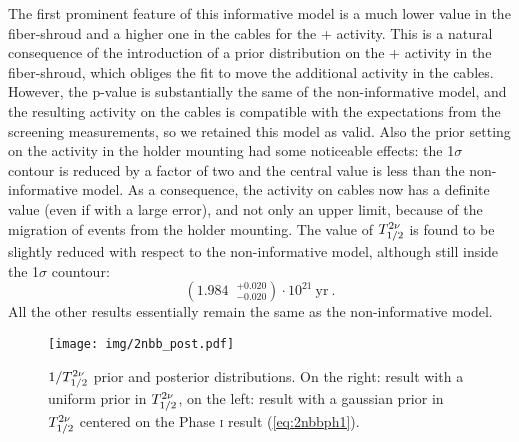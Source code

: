  The first prominent feature of this informative model is a much lower value in the fiber-shroud and a higher one in the cables for the  +  activity. This is a natural consequence of the introduction of a prior distribution on the  +  activity in the fiber-shroud, which obliges the fit to move the additional activity in the cables. However, the p-value is substantially the same of the non-informative model, and the resulting activity on the cables is compatible with the expectations from the screening measurements, so we retained this model as valid. Also the prior setting on the  activity in the holder mounting had some noticeable effects: the 1$\sigma$ contour is reduced by a factor of two and the central value is less than the non-informative model. As a consequence, the  activity on cables now has a definite value (even if with a large error), and not only an upper limit, because of the migration of events from the holder mounting. The value of $T_{1/2}^{2\nu}$ is found to be slightly reduced with respect to the non-informative model, although still inside the 1$\sigma$ countour:
\begin{equation}(1.984\;\;^{+0.020}_{-0.020})\cdot10^{21}\ \text{yr}\ .\label{eq:stat_result}\end{equation}
All the other results essentially remain the same as the non-informative model.
\begin{figure}
	\centering
	\texttt{[image: img/2nbb\_post.pdf]}
	\caption{$1/T_{1/2}^{2\nu}$ prior and posterior distributions. On the right: result with a uniform prior in $T_{1/2}^{2\nu}$, on the left: result with a gaussian prior in $T_{1/2}^{2\nu}$ centered on the {\gerda} Phase \textsc{i} result (\ref{eq:2nbbph1}).}\label{fig:2nbbpost}
\end{figure}
